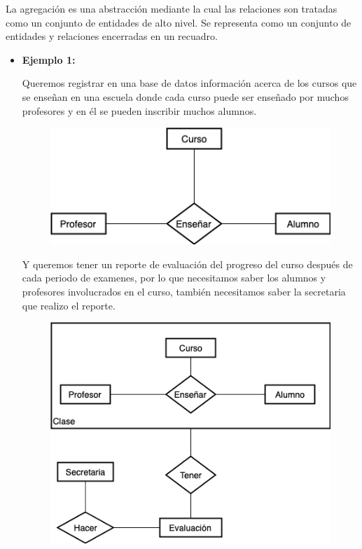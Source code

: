 \documentclass[letterpaper,11pt]{article}
\begin{document}
\begin{itemize}
    La agregación es una abstracción mediante la cual las relaciones
    son tratadas como un conjunto de entidades de alto nivel. Se
    representa como un conjunto de entidades y relaciones encerradas
    en un recuadro.

    \begin{itemize}
        \item  \textbf{Ejemplo 1:}

               Queremos registrar en una base de datos información acerca
               de los cursos que se enseñan en una escuela donde cada
               curso puede ser enseñado por muchos profesores y en él
               se pueden inscribir muchos alumnos.

               \begin{figure}[h]
                \centering
                \includegraphics[scale=0.6]{./imagenes/Ejemplo1.jpg}
                \end{figure}

               Y queremos tener un reporte de evaluación del
               progreso del curso después de cada periodo de examenes,
               por lo que necesitamos saber los alumnos y profesores
               involucrados en el curso, también necesitamos saber
               la secretaria que realizo el reporte.

               \begin{figure}[H]
                \centering
                \includegraphics[scale=0.6]{./imagenes/Ejemplo1a.jpg}
                \end{figure}


\end{itemize}
\end{itemize}
\end{document}
